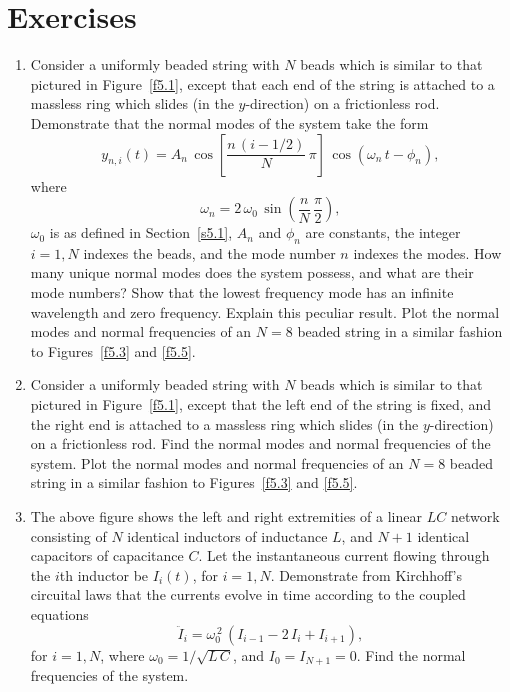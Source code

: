 \section{Exercises}
{\small
\begin{enumerate}
\item Consider a uniformly beaded string with $N$ beads which is similar
to that pictured in Figure~\ref{f5.1}, except that each end of the string
is attached to a massless ring which slides (in the $y$-direction)
 on a frictionless rod.
Demonstrate that the normal modes of the system take the form
$$
y_{n,i}(t) = A_n\,\cos\left[\frac{n\,(i-1/2)}{N}\,\pi\right]\,\cos(\omega_n\,t-\phi_n),
$$
where
$$
\omega_n = 2\,\omega_0\,\sin\left(\frac{n}{N}\,\frac{\pi}{2}\right),
$$
$\omega_0$ is as defined in Section~\ref{s5.1},  $A_n$ and $\phi_n$ are constants, the integer $i=1,N$ indexes the beads, and the mode number $n$ indexes the
modes.  How
many unique normal modes does the system possess, and what are their mode numbers?
Show that the lowest frequency mode has an infinite wavelength and zero frequency. 
Explain this peculiar result. Plot the normal modes and normal frequencies
of an $N=8$ beaded string in a similar fashion to Figures~\ref{f5.3} and \ref{f5.5}.

\item Consider a uniformly beaded string with $N$ beads which is similar
to that pictured in Figure~\ref{f5.1}, except that the left end of the string is
fixed, and the right  end  is attached to a massless ring which slides (in the $y$-direction)
on a frictionless rod.  Find the normal
modes and normal frequencies of the system. Plot the normal modes and normal frequencies
of an $N=8$ beaded string in a similar fashion to Figures~\ref{f5.3} and \ref{f5.5}.

\begin{figure}[h]
\epsfysize=0.9in
\centerline{}
\end{figure}
\item The above figure  shows the left and right extremities of a linear $LC$ network consisting of $N$ identical inductors of inductance $L$, and $N+1$
identical capacitors of capacitance $C$. Let the instantaneous current
flowing through the $i$th inductor be $I_i(t)$, for $i=1,N$. Demonstrate from
Kirchhoff's circuital laws that the currents evolve in time according to the
coupled equations
$$
\ddot{I}_i = \omega_0^{\,2}\,(I_{i-1}-2\,I_i+I_{i+1}),
$$
for $i=1,N$, where $\omega_0=1/\sqrt{L\,C}$, and $I_0=I_{N+1}=0$. 
Find the normal frequencies of the system.


\end{enumerate}}
